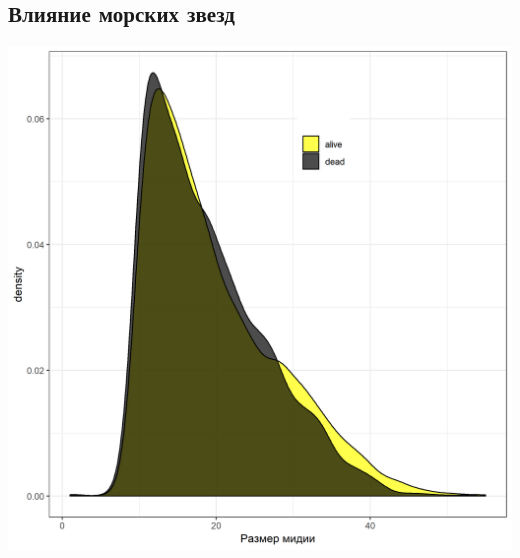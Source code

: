 \documentclass[a0,portrait]{a0poster}
\begin{document}
\begin{multicols}{2}
\subsection*{Влияние морских звезд}
		






		
		
		














%
\begin{minipage}[t]{0.46\linewidth}		
	\begin{center}\vspace{0.1cm}
			\includegraphics[width=0.9\linewidth]{Size_dist_ast.png}
			\label{Fig_siz_ast}
		\end{center}\vspace{0.5cm}
\end{minipage}\hspace{1cm}
%
\begin{minipage}[t]{0.46\linewidth}		
	\begin{center}\vspace{0.1cm}

\end{center}
\end{minipage}
\end{multicols}
\end{document}
